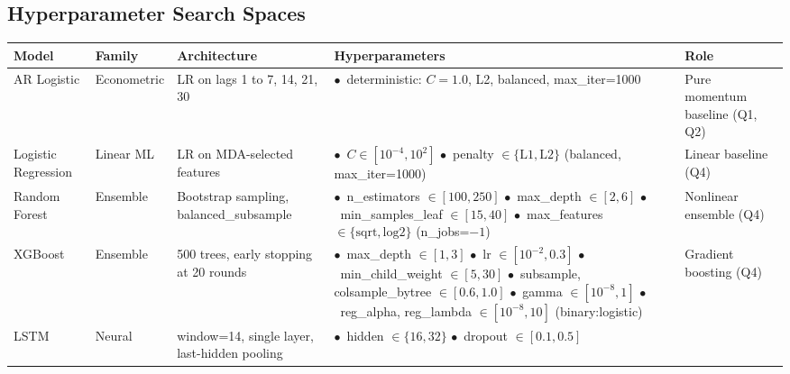 \documentclass[11pt,a4paper,oneside]{article}
\begin{document}
\subsection{Hyperparameter Search Spaces}\label{app:hyperparams}

\begin{table}[H]
\centering
\scriptsize
\setlength{\tabcolsep}{4pt}
\renewcommand{\arraystretch}{0.9}
\begin{tabular}{p{1.5cm}p{1.5cm}p{2.4cm}p{5.4cm}p{1.9cm}}
\toprule
Model & Family & Architecture & Hyperparameters & Role \\
\midrule
AR Logistic & Econometric & LR on lags 1 to 7, 14, 21, 30 & $\bullet$\ deterministic: $C=1.0$, L2, balanced, max\_iter=1000 & Pure momentum baseline (Q1, Q2) \\
Logistic Regression & Linear ML & LR on MDA-selected features &
$\bullet$\ $C \in [10^{-4}, 10^{2}]$ \newline
$\bullet$\ penalty $\in \{\text{L1}, \text{L2}\}$ \newline
(balanced, max\_iter=1000)
& Linear baseline (Q4) \\
Random Forest & Ensemble & Bootstrap sampling, balanced\_subsample &
$\bullet$\ n\_estimators $\in [100, 250]$ \newline
$\bullet$\ max\_depth $\in [2, 6]$ \newline
$\bullet$\ min\_samples\_leaf $\in [15, 40]$ \newline
$\bullet$\ max\_features $\in \{\text{sqrt}, \text{log2}\}$ \newline
(n\_jobs=$-1$)
& Nonlinear ensemble (Q4) \\
XGBoost & Ensemble & 500 trees, early stopping at 20 rounds &
$\bullet$\ max\_depth $\in [1, 3]$ \newline
$\bullet$\ lr $\in [10^{-2}, 0.3]$ \newline
$\bullet$\ min\_child\_weight $\in [5, 30]$ \newline
$\bullet$\ subsample, colsample\_bytree $\in [0.6, 1.0]$ \newline
$\bullet$\ gamma $\in [10^{-8}, 1]$ \newline
$\bullet$\ reg\_alpha, reg\_lambda $\in [10^{-8}, 10]$ \newline
(binary:logistic)
& Gradient boosting (Q4) \\
LSTM & Neural & window=14, single layer, last-hidden pooling &
$\bullet$\ hidden $\in \{16, 32\}$ \newline
$\bullet$\ dropout $\in [0.1, 0.5]$ \newline

\end{tabular}
\end{table}
\end{document}
